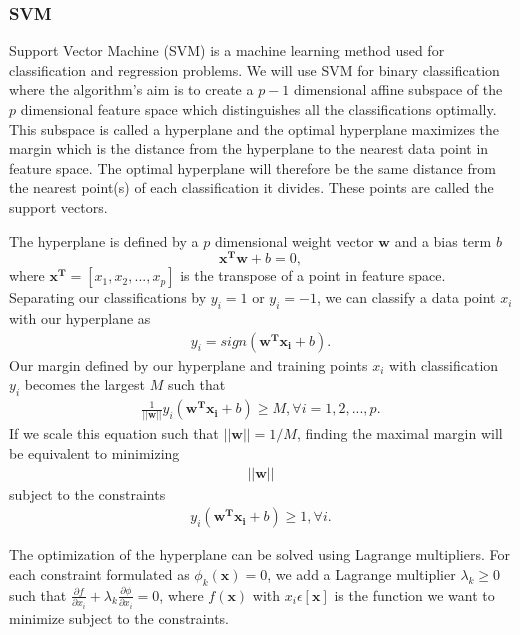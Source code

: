 \subsubsection{SVM}
Support Vector Machine (SVM) is a machine learning method used for 
classification and regression problems. We will use SVM for binary 
classification where the algorithm's aim is to create a $p-1$ dimensional
affine subspace of the $p$ dimensional feature space which distinguishes all the 
classifications optimally. This subspace is called a hyperplane and the 
optimal hyperplane maximizes the margin which is the distance from the 
hyperplane to the nearest data point in feature space. The optimal hyperplane 
will therefore be the same distance from the nearest point(s) of each 
classification it divides. These points are called the support vectors.

The hyperplane is defined by a $p$ dimensional weight vector $\boldsymbol{w}$ and a 
bias term $b$
\begin{equation}
\boldsymbol{x^T}\boldsymbol{w} + b =0, 
\label{eq:hyperplane}
\end{equation}
where $\boldsymbol{x^T}=[x_1,x_2,...,x_p]$ is the transpose of a point in feature space.
Separating our classifications by $y_i=1$ or $y_i=-1$, we can classify a 
data point $x_i$ with our hyperplane as 
\begin{gather*}
y_i = sign(\boldsymbol{w^T}\boldsymbol{x_i}+b). 
\end{gather*}
Our margin defined by our hyperplane and training points $x_i$ with classification $y_i$ becomes the largest $M$ such that 
\begin{gather}
\frac{1}{||\boldsymbol{w}||}y_i(\boldsymbol{w^Tx_i}+b) \ge M, \forall i=1,2,...,p. 
\end{gather}
If we scale this equation such that $||\boldsymbol{w}||=1/M$, finding the maximal margin 
will be equivalent to minimizing 
\begin{gather*}
||\boldsymbol{w}||
\end{gather*}
subject to the constraints 
\begin{gather*}
y_i(\boldsymbol{w^Tx_i}+b) \ge 1, \forall i.
\end{gather*}

The optimization of the hyperplane can be solved using Lagrange multipliers. 
For each constraint formulated as $\phi_k (\boldsymbol{x})=0$, we add a Lagrange
multiplier $\lambda _k \ge 0$ such that $\frac{\partial f}{\partial x_i}+\lambda_k \frac{\partial \phi }{\partial x_i}=0$,
where $f(\boldsymbol{x})$ with $x_i \epsilon [\boldsymbol{x}]$ is the function we want to minimize 
subject to the constraints.

